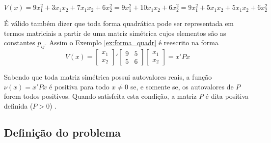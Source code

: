 \begin{example}\label{ex:forma_quadr}
\begin{equation*}
V(x) = 9x_1^2+3x_1x_2+7x_1x_2+6x_2^2 = 9x_1^2+10x_1x_2+6x_2^2 = 9x_1^2+5x_1x_2+5x_1x_2+6x_2^2
\end{equation*}
\end{example}

É válido também dizer que toda forma quadrática pode ser representada em termos matriciais a partir de uma matriz simétrica cujos elementos são as constantes $p_{ij}$. Assim o Exemplo \ref{ex:forma_quadr} é reescrito na forma
\begin{equation*}
V(x) = \begin{bmatrix}x_1\\x_2\end{bmatrix}'\begin{bmatrix}9&5\\5&6\end{bmatrix}\begin{bmatrix}x_1\\x_2\end{bmatrix} = x'Px
\end{equation*}

Sabendo que toda matriz simétrica possui autovalores reais, a função $\nu(x) = x'Px$ é positiva para todo $x \neq 0$ se, e somente se, os autovalores de $P$ forem todos positivos. Quando satisfeita esta condição, a matriz $P$ é dita positiva definida ($P > 0$) \cite{bookboydl:1994}.

\subsection{Definição do problema}\label{subsec:contextualization}

